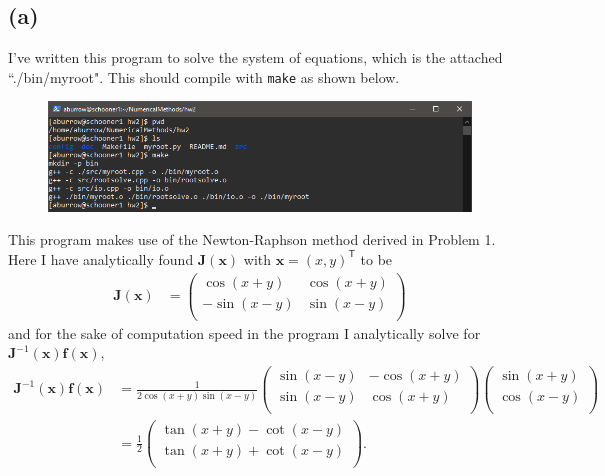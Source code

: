 \documentclass[12pt]{article}
\begin{document}
\subsection*{(a)}

I've written this program to solve the system of equations, which is the
attached ``./bin/myroot". This should compile with \texttt{make} as shown
below.

\begin{figure}[H]
    \centering
    \includegraphics[width=1.0\textwidth]{compile}
    \label{fig:compile}
\end{figure}

This program makes use of the Newton-Raphson method derived in Problem 1. Here
I have analytically found $\boldsymbol{J}(\boldsymbol{x})$ with
$\boldsymbol{x} = (x, y)^\mathsf{T}$ to be
$$
\begin{aligned}
\boldsymbol{J}(\boldsymbol{x})
&=
\begin{pmatrix}
\cos(x + y) & \cos(x + y) \\
-\sin(x - y) & \sin(x - y) \\
\end{pmatrix}
\end{aligned}
$$
and for the sake of computation speed in the program I analytically solve for
$\boldsymbol{J}^{-1}(\boldsymbol{x}) \boldsymbol{f}(\boldsymbol{x})$,
$$
\begin{aligned}
\boldsymbol{J}^{-1}(\boldsymbol{x}) \boldsymbol{f}(\boldsymbol{x})
&= \frac{1}{2 \cos(x + y) \sin(x - y)}
\begin{pmatrix}
\sin(x - y) & -\cos(x + y) \\
\sin(x - y) & \cos(x + y) \\
\end{pmatrix}
\begin{pmatrix}
\sin(x + y) \\
\cos(x - y) \\
\end{pmatrix} \\
&= \frac{1}{2}
\begin{pmatrix}
\tan(x + y) - \cot(x - y) \\
\tan(x + y) + \cot(x - y) \\
\end{pmatrix}.
\end{aligned}
$$
\end{document}
